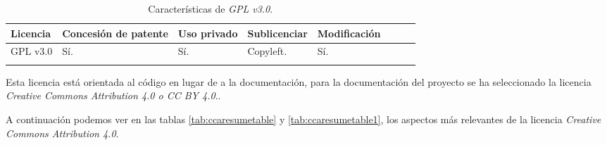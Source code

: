 \begin{longtable}[]{@{}llllllll@{}} 
\toprule 
\begin{minipage}[b]{0.15\columnwidth}\raggedright\strut
Licencia\strut
\end{minipage} & \begin{minipage}[b]{0.18\columnwidth}\raggedright\strut
Concesión de patente\strut
\end{minipage} & \begin{minipage}[b]{0.17\columnwidth}\raggedright\strut
Uso privado\strut
\end{minipage} & \begin{minipage}[b]{0.15\columnwidth}\raggedright\strut
Sublicenciar\strut
\end{minipage} & \begin{minipage}[b]{0.17\columnwidth}\raggedright\strut
Modificación\strut
\end{minipage}\tabularnewline
\midrule
\endhead
\begin{minipage}[t]{0.15\columnwidth}\raggedright\strut
GPL v3.0\strut
\end{minipage} & \begin{minipage}[t]{0.18\columnwidth}\raggedright\strut
Sí.\strut
\end{minipage} & \begin{minipage}[t]{0.17\columnwidth}\raggedright\strut
Sí.\strut
\end{minipage} & \begin{minipage}[t]{0.15\columnwidth}\raggedright\strut
Copyleft.\strut
\end{minipage} & \begin{minipage}[t]{0.17\columnwidth}\raggedright\strut
Sí.\strut
\end{minipage}\tabularnewline
\bottomrule
\caption{Características de \textit{GPL v3.0}.}
\label{gnuresumetable1}
\end{longtable}

Esta licencia está orientada al código en lugar de a la documentación, para la documentación del proyecto se ha seleccionado la licencia \textit{Creative Commons Attribution 4.0 o CC BY 4.0}..

A continuación podemos ver en las tablas \ref{tab:ccaresumetable} y \ref{tab:ccaresumetable1}, los aspectos más relevantes de la licencia \textit{Creative Commons Attribution 4.0}.

